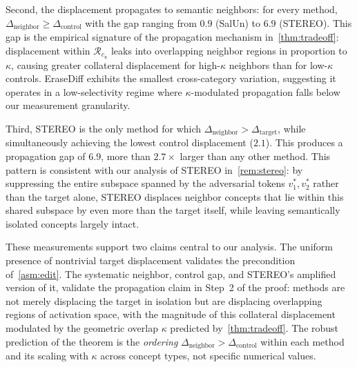 Second, the displacement propagates to semantic neighbors: for every method, $\Delta_{\mathrm{neighbor}} \geq \Delta_{\mathrm{control}}$ with the gap ranging from $0.9$ (SalUn) to $6.9$ (STEREO). This gap is the empirical signature of the propagation mechanism in~\cref{thm:tradeoff}: displacement within $\mathcal{R}_{c_u}$ leaks into overlapping neighbor regions in proportion to $\kappa$, causing greater collateral displacement for high-$\kappa$ neighbors than for low-$\kappa$ controls. EraseDiff exhibits the smallest cross-category variation, suggesting it operates in a low-selectivity regime where $\kappa$-modulated propagation falls below our measurement granularity.

Third, STEREO is the only method for which $\Delta_{\mathrm{neighbor}} > \Delta_{\mathrm{target}}$, while simultaneously achieving the lowest control displacement ($2.1$). This produces a propagation gap of $6.9$, more than $2.7\times$ larger than any other method. This pattern is consistent with our analysis of STEREO in~\cref{rem:stereo}: by suppressing the entire subspace spanned by the adversarial tokens $v_1^*, v_2^*$ rather than the target alone, STEREO displaces neighbor concepts that lie within this shared subspace by even more than the target itself, while leaving semantically isolated concepts largely intact. 

These measurements support two claims central to our analysis. The uniform presence of nontrivial target displacement validates the precondition of~\cref{asm:edit}. The systematic neighbor, control gap, and STEREO's amplified version of it, validate the propagation claim in Step~2 of the proof: methods are not merely displacing the target in isolation but are displacing overlapping regions of activation space, with the magnitude of this collateral displacement modulated by the geometric overlap $\kappa$ predicted by~\cref{thm:tradeoff}. The robust prediction of the theorem is the \emph{ordering} $\Delta_{\mathrm{neighbor}} > \Delta_{\mathrm{control}}$ within each method and its scaling with $\kappa$ across concept types, not specific numerical values.



